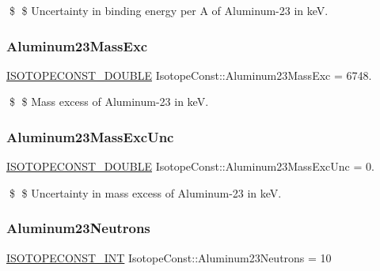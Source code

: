 \$ \$ Uncertainty in binding energy per A of Aluminum-\/23 in keV. \mbox{\label{group___isotope_const-_aluminum-_al23_gab5c9eaf2b8ccd73c0f4ce413c2b1a9b7}} 
\subsubsection{\texorpdfstring{Aluminum23\+Mass\+Exc}{Aluminum23MassExc}}
{\footnotesize\ttfamily \mbox{\hyperlink{group___isotope_const-_macros_ga8f45a7272ce02c0b4c65c44636ed719a}{I\+S\+O\+T\+O\+P\+E\+C\+O\+N\+S\+T\+\_\+\+D\+O\+U\+B\+LE}} Isotope\+Const\+::\+Aluminum23\+Mass\+Exc = 6748.}

\$ \$ Mass excess of Aluminum-\/23 in keV. \mbox{\label{group___isotope_const-_aluminum-_al23_ga80be217f1b372cbe79b42d5241cc7448}} 
\subsubsection{\texorpdfstring{Aluminum23\+Mass\+Exc\+Unc}{Aluminum23MassExcUnc}}
{\footnotesize\ttfamily \mbox{\hyperlink{group___isotope_const-_macros_ga8f45a7272ce02c0b4c65c44636ed719a}{I\+S\+O\+T\+O\+P\+E\+C\+O\+N\+S\+T\+\_\+\+D\+O\+U\+B\+LE}} Isotope\+Const\+::\+Aluminum23\+Mass\+Exc\+Unc = 0.}

\$ \$ Uncertainty in mass excess of Aluminum-\/23 in keV. \mbox{\label{group___isotope_const-_aluminum-_al23_ga77349957d5392628ff730a9a16f22cbe}} 
\subsubsection{\texorpdfstring{Aluminum23\+Neutrons}{Aluminum23Neutrons}}
{\footnotesize\ttfamily \mbox{\hyperlink{group___isotope_const-_macros_ga5f18360b3e99483a35c32d789e62621c}{I\+S\+O\+T\+O\+P\+E\+C\+O\+N\+S\+T\+\_\+\+I\+NT}} Isotope\+Const\+::\+Aluminum23\+Neutrons = 10}

